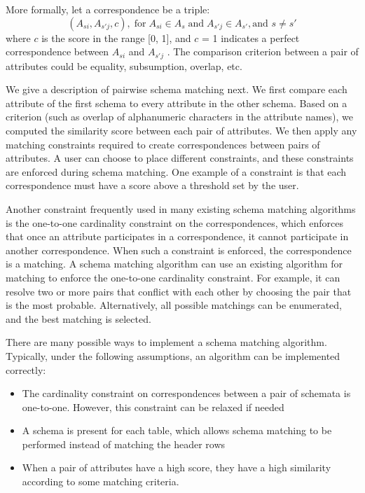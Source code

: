 More formally, let a correspondence be a triple:
\[
(A_{si},A_{s'j},c), \; \textrm{for} \; A_{si}\in A_{s} \; \textrm{and} \; A_{s'j}\in A_{s'},\text{and }s\neq s'
\]
where $c$ is the score in the range {[}0, 1{]}, and $c$ = 1 indicates a perfect correspondence between $A_{si}$ and $A_{s'j}$ . The comparison criterion between a pair of attributes could be equality, subsumption, overlap, etc.

We give a description of pairwise schema matching next. We first compare each attribute of the first schema to every attribute in the other schema. Based on a criterion (such as overlap of alphanumeric characters in the attribute names), we computed the similarity score between each pair of attributes. We then apply any matching constraints required to create correspondences between pairs of attributes. A user can choose to place different constraints, and these constraints are enforced during schema matching. One example of a constraint is that each correspondence must have a score above a threshold set by the user.

Another constraint frequently used in many existing schema matching algorithms is the one-to-one cardinality constraint on the correspondences, which enforces that once an attribute participates in a correspondence, it cannot participate in another correspondence. When such a constraint is enforced, the correspondence is a matching. A schema matching algorithm can use an existing algorithm for matching to enforce the one-to-one cardinality constraint. For example, it can resolve two or more pairs that conflict with each other by choosing the pair that is the most probable. Alternatively, all possible matchings can be enumerated, and the best matching is selected.

There are many possible ways to implement a schema matching algorithm. Typically, under the following assumptions, an algorithm can be implemented correctly:

\begin{itemize}
\item The cardinality constraint on correspondences between a pair of schemata is one-to-one. However, this constraint can be relaxed if needed
\item A schema is present for each table, which allows schema matching to be performed instead of matching the header rows
\item When a pair of attributes have a high score, they have a high similarity according to some matching criteria.	
\end{itemize}

